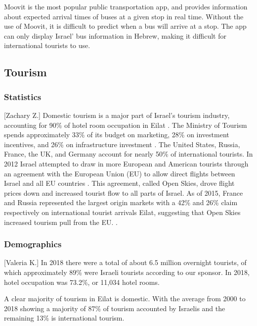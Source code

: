 \documentclass[12pt]{article}                       %
\begin{document}
Moovit is the most popular public transportation app, and provides information about expected arrival times of buses at a given stop in real time. Without the use of Moovit, it is difficult to predict when a bus will arrive at a stop. The app can only display Israel' bus information in Hebrew, making it difficult for international tourists to use.

\subsection{Tourism}
\subsubsection{Statistics}[Zachary Z.]
Domestic tourism is a major part of Israel's tourism industry, accounting for 90\% of hotel room occupation in Eilat \cite{Benner2017UpgradingEilat}. The Ministry of Tourism spends approximately 33\% of its budget on marketing, 28\% on investment incentives, and 26\% on infrastructure investment \cite{Benner2017UpgradingEilat}. The United States, Russia, France, the UK, and Germany account for nearly 50\% of international tourists. In 2012 Israel attempted to draw in more European and American tourists through an agreement with the European Union (EU) to allow direct flights between Israel and all EU countries \cite{Benner2017UpgradingEilat}. This agreement, called Open Skies, drove flight prices down and increased tourist flow to all parts of Israel. As of 2015, France and Russia represented the largest origin markets with a 42\% and 26\% claim respectively on international tourist arrivals Eilat, suggesting that Open Skies increased tourism pull from the EU. \cite{Benevolo2016SmartBenefits}.



\subsubsection{Demographics}[Valeria K.]
In 2018 there were a total of about 6.5 million overnight tourists, of which approximately 89\% were Israeli tourists according to our sponsor. In 2018, hotel occupation was 73.2\%, or 11,034 hotel rooms.

A clear majority of tourism in Eilat is domestic. With the average from 2000 to 2018 showing a majority of 87\% of tourism accounted by Israelis and the remaining 13\% is international tourism. 
\end{document}
